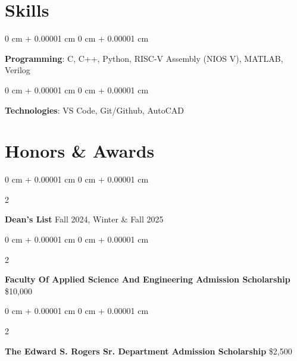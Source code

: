 \documentclass[10pt, letterpaper]{article}
\newenvironment{onecolentry}{
    \begin{adjustwidth}{
        0 cm + 0.00001 cm
    }{
        0 cm + 0.00001 cm
    }
}{
    \end{adjustwidth}
} %
\newenvironment{twocolentry}[2][]{
    \onecolentry
    \def\secondColumn{#2}
    \setcolumnwidth{\fill, 4.5 cm}
    \begin{paracol}{2}
}{
    \switchcolumn \raggedleft \secondColumn
    \end{paracol}
    \endonecolentry
} %
\begin{document}
    \section{Skills}
        
        \begin{onecolentry}
            \textbf{Programming}: C, C++, Python, RISC-V Assembly (NIOS V), MATLAB, Verilog
        \end{onecolentry}
        
        \vspace{0.1 cm}

        \begin{onecolentry}
            \textbf{Technologies}: VS Code, Git/Github, AutoCAD
        \end{onecolentry}

    \section{Honors \& Awards}
    
    \begin{twocolentry}{Fall 2024, Winter \& Fall 2025}
            \textbf{Dean's List}\end{twocolentry}
            
    \vspace{0.05 cm}
    \begin{twocolentry}{\$10,000}
            \textbf{Faculty Of Applied Science And Engineering Admission Scholarship}\end{twocolentry}
            
    \vspace{0.05 cm}
    \begin{twocolentry}{\$2,500}
            \textbf{The Edward S. Rogers Sr. Department Admission Scholarship}\end{twocolentry}
\end{document}

